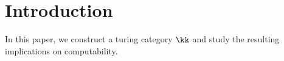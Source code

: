 {}%
\section*{Introduction}

In this paper, we construct a turing category
$\kk$ and study the resulting implications
on computability.



